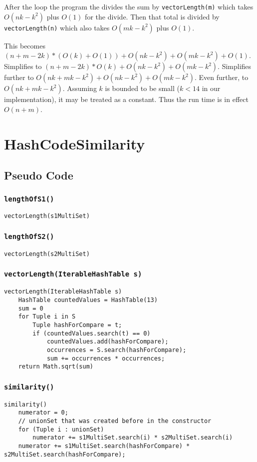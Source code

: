 \documentclass[10pt,letterpaper]{article}
\begin{document}
After the loop the program the divides the sum by \texttt{vectorLength(m)} which takes $O(nk-k^2)$ plus $O(1)$ for the divide. Then that total is divided by \texttt{vectorLength(n)} which also takes $O(mk-k^2)$ plus $O(1)$.

This becomes $(n+m-2k)*(O(k)+O(1))+O(nk-k^2)+O(mk-k^2)+O(1)$. Simplifies to $(n+m-2k)*O(k)+O(nk-k^2)+O(mk-k^2)$. Simplifies further to $O(nk+mk-k^2)+O(nk-k^2)+O(mk-k^2)$. Even further, to $O(nk+mk-k^2)$. Assuming $k$ is bounded to be small ($k<14$ in our implementation), it may be treated as a constant. Thus the run time is in effect $O(n+m)$.
\section{HashCodeSimilarity}
\subsection{Pseudo Code}
\subsubsection{\texttt{lengthOfS1()}}
\begin{verbatim}
vectorLength(s1MultiSet)
\end{verbatim}
\subsubsection{\texttt{lengthOfS2()}}
\begin{verbatim}
vectorLength(s2MultiSet)
\end{verbatim}
\subsubsection{\texttt{vectorLength(IterableHashTable s)}}
\begin{verbatim}
vectorLength(IterableHashTable s)
    HashTable countedValues = HashTable(13)
    sum = 0
    for Tuple i in S
        Tuple hashForCompare = t;
        if (countedValues.search(t) == 0)
            countedValues.add(hashForCompare);
            occurrences = S.search(hashForCompare);
            sum += occurrences * occurrences;
    return Math.sqrt(sum)
\end{verbatim}
\subsubsection{\texttt{similarity()}}
\begin{verbatim}
similarity()
    numerator = 0;
    // unionSet that was created before in the constructor
    for (Tuple i : unionSet)
        numerator += s1MultiSet.search(i) * s2MultiSet.search(i)
    numerator += s1MultiSet.search(hashForCompare) * s2MultiSet.search(hashForCompare);
\end{verbatim}
\end{document}
